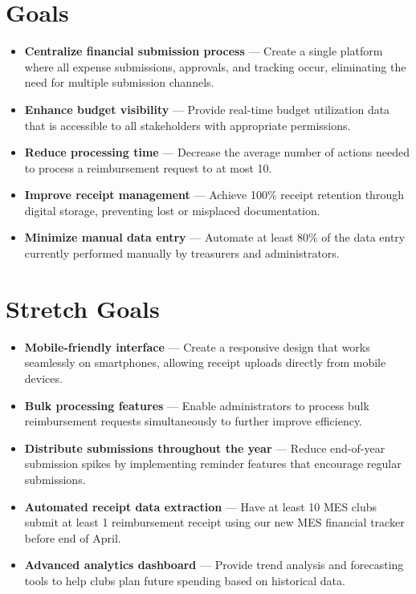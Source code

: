 \documentclass{article}
\begin{document}
\section{Goals}
\begin{itemize}
  \item \textbf{Centralize financial submission process} — Create a single platform where all expense submissions, approvals, and tracking occur, eliminating the need for multiple submission channels.

  \item \textbf{Enhance budget visibility} — Provide real-time budget utilization data that is accessible to all stakeholders with appropriate permissions.

  \item \textbf{Reduce processing time} — Decrease the average number of actions needed to process a reimbursement request to at most 10.

  \item \textbf{Improve receipt management} — Achieve 100\% receipt retention through digital storage, preventing lost or misplaced documentation.

  \item \textbf{Minimize manual data entry} — Automate at least 80\% of the data entry currently performed manually by treasurers and administrators.
\end{itemize}

\section{Stretch Goals}
\begin{itemize}
  \item \textbf{Mobile-friendly interface} — Create a responsive design that works seamlessly on smartphones, allowing receipt uploads directly from mobile devices.

  \item \textbf{Bulk processing features} — Enable administrators to process bulk reimbursement requests simultaneously to further improve efficiency.

  \item \textbf{Distribute submissions throughout the year} — Reduce end-of-year submission spikes by implementing reminder features that encourage regular submissions.

  \item \textbf{Automated receipt data extraction} — Have at least 10 MES clubs submit at least 1 reimbursement receipt using our new MES financial tracker before end of April.

  \item \textbf{Advanced analytics dashboard} — Provide trend analysis and forecasting tools to help clubs plan future spending based on historical data.
\end{itemize}
\end{document}
